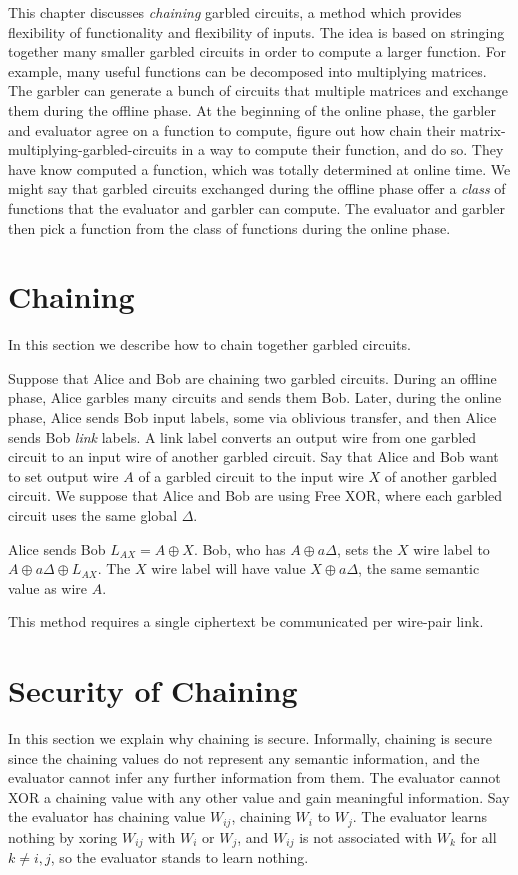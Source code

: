 This chapter discusses \textit{chaining} garbled circuits, a method which provides flexibility of functionality and flexibility of inputs.
The idea is based on stringing together many smaller garbled circuits in order to compute a larger function.
For example, many useful functions can be decomposed into multiplying matrices.
The garbler can generate a bunch of circuits that multiple matrices and exchange them during the offline phase.
At the beginning of the online phase, the garbler and evaluator agree on a function to compute, figure out how chain their matrix-multiplying-garbled-circuits in a way to compute their function, and do so.
They have know computed a function, which was totally determined at online time.
We might say that garbled circuits exchanged during the offline phase offer a \textit{class} of functions that the evaluator and garbler can compute.
The evaluator and garbler then pick a function from the class of functions during the online phase.

\section{Chaining}
In this section we describe how to chain together garbled circuits.

Suppose that Alice and Bob are chaining two garbled circuits.
During an offline phase, Alice garbles many circuits and sends them Bob.
Later, during the online phase, Alice sends Bob input labels, some via oblivious transfer, and then Alice sends Bob \textit{link} labels.
A link label converts an output wire from one garbled circuit to an input wire of another garbled circuit.
Say that Alice and Bob want to set output wire $A$ of a garbled circuit to the input wire $X$ of another garbled circuit.
We suppose that Alice and Bob are using Free XOR, where each garbled circuit uses the same global $\Delta$.

Alice sends Bob $L_{AX} = A \oplus X$.
Bob, who has $A \oplus a\Delta$, sets the $X$ wire label to $A \oplus a\Delta \oplus L_{AX}$.
The $X$ wire label will have value $X \oplus a\Delta$, the same semantic value as wire $A$.

This method requires a single ciphertext be communicated per wire-pair link.

\section{Security of Chaining}
In this section we explain why chaining is secure.
Informally, chaining is secure since the chaining values do not represent any semantic information, and the evaluator cannot infer any further information from them.
The evaluator cannot XOR a chaining value with any other value and gain meaningful information.
Say the evaluator has chaining value $W_{ij}$, chaining $W_i$ to $W_j$. 
The evaluator learns nothing by xoring $W_{ij}$ with $W_i$ or $W_j$, and $W_{ij}$ is not associated with $W_k$ for all $k \neq i,j$, so the evaluator stands to learn nothing.

